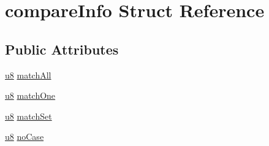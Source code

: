 \hypertarget{structcompare_info}{\section{compare\-Info Struct Reference}
\label{structcompare_info}
}
\subsection*{Public Attributes}
\begin{DoxyCompactItemize}
\item 
\hyperlink{sqlite3_8c_a74a0f6424ae628af25f23f0a35f6ead3}{u8} \hyperlink{structcompare_info_a1161e850029ef556e6daee856d32b2e2}{match\-All}
\item 
\hyperlink{sqlite3_8c_a74a0f6424ae628af25f23f0a35f6ead3}{u8} \hyperlink{structcompare_info_ab9aabbf6d3df26bad786b532330a2fd7}{match\-One}
\item 
\hyperlink{sqlite3_8c_a74a0f6424ae628af25f23f0a35f6ead3}{u8} \hyperlink{structcompare_info_a5d2ff58a72c9eb7d22f18915c1751655}{match\-Set}
\item 
\hyperlink{sqlite3_8c_a74a0f6424ae628af25f23f0a35f6ead3}{u8} \hyperlink{structcompare_info_a6de76861b066547321f7a255cb7042ab}{no\-Case}
\end{DoxyCompactItemize}


